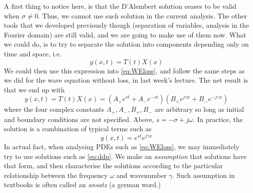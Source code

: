 \documentclass[11pt,twoside,a4paper,english]{book}
\begin{document}
A first thing to notice here, is that the D'Alembert solution ceases to be valid when $\sigma  \neq 0$. Thus, we cannot use such solution in the current analysis. The other tools that we developed previously though (separation of variables, analysis in the Fourier domain) are still valid, and we are going to make use of them now. What we could do, is to try to separate the solution into components depending only on time and space, i.e.
\begin{equation}
y(x,t) = T(t)X(x)
\end{equation}
We could then use this expression into \eqref{eq:WEloss}, and follow the same steps as we did for the wave equation without loss, in last week's lecture. The net result is that we end up with
\begin{equation}
y(x,t) = T(t)X(x) = \left(A_+ e^{st} + A_- e^{-st} \right)\left(B_+ e^{j\gamma x} + B_- e^{-j \gamma x} \right)
\end{equation}
where the four complex constants $A_+,A_-,B_+,B_-$ are arbitrary so long as initial and boundary conditions are not specified. Above, $s = -\sigma + j \omega$. In practice, the solution is a combination of typical terms such as
\begin{equation}\label{eq:ddp}
y(x,t) = e^{st}e^{j\gamma x} 
\end{equation}
In actual fact, when analysing PDEs such as \eqref{eq:WEloss}, we may immediately try to use solutions such as \eqref{eq:ddp}. We make an \emph{assumption} that solutions have that form, and then characterise the solutions according to the particular relationship between the frequency $\omega$ and wavenumber $\gamma$. Such assumption in textbooks is often called an \emph{ansatz} (a german word.)
\end{document}
